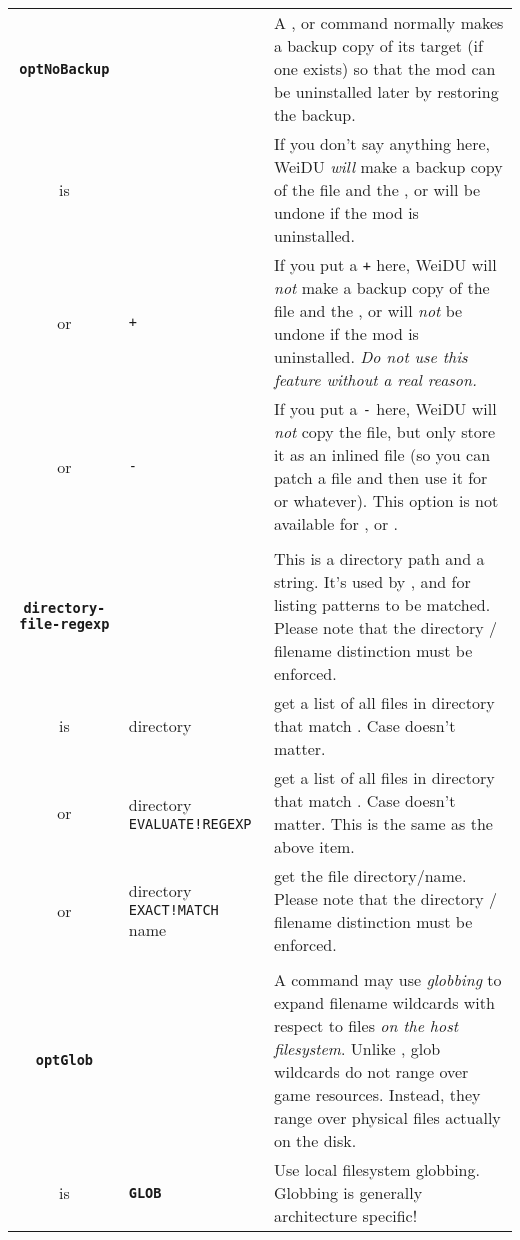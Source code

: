 \documentclass{article}
\def\ttref#1{\ahrefloc{#1}{\tt #1}}
\def\DEFINE#1{{\tt \bf #1}\label{#1}\index{#1}}
\def\t#1{{\tt #1}}
\begin{document}
\begin{tabular}{cp{10in}|p{10in}}
\DEFINE{optNoBackup} & &
  A \ttref{COPY}, \ttref{MOVE} or \ttref{DELETE} command normally makes a backup copy of its target (if one
  exists) so that the mod can be uninstalled later by restoring the backup.
  \\

  is &   & If you don't say anything here, WeiDU {\em will} make a backup
           copy of the file and the \ttref{COPY}, \ttref{MOVE} or \ttref{DELETE} will be undone if the mod
           is uninstalled. \\
  or & \t{+} & If you put a \t{+} here, WeiDU will {\em not} make a backup
           copy of the file and the \ttref{COPY}, \ttref{MOVE} or \ttref{DELETE} will {\em not} be
           undone if the mod is uninstalled. {\em Do not use this feature without
			a real reason.} \\
  or & \t{-} & If you put a \t{-} here, WeiDU will {\em not} copy the file,
           but only store it as an inlined file (so you can patch a file and
           then use it for \ttref{EXTEND!BOTTOM} or whatever).
           This option is not available for \ttref{COPY!LARGE}, \ttref{MOVE} or \ttref{DELETE}. \\
\\

\DEFINE{directory-file-regexp} & & This is a directory path and a \ttref{regexp} string.
It's used by \ttref{MAKE!BIFF}, \ttref{ACTION!BASH!FOR} and \ttref{PATCH!BASH!FOR}
for listing patterns to be matched. Please note that
the directory / filename distinction must be enforced. \\
is & directory \ttref{regexp} & get a list of all files in directory that match \ttref{regexp}.
Case doesn't matter. \\
or & directory \t{EVALUATE!REGEXP} \ttref{regexp} & get a list of all files in directory that match \ttref{regexp}.
Case doesn't matter. This is the same as the above item. \\
or & directory \t{EXACT!MATCH} name & get the file directory/name. Please note that
the directory / filename distinction must be enforced. \\

\\
\DEFINE{optGlob} & &
  A \ttref{COPY} command may use \emph{globbing} to expand filename
  wildcards with respect to files \emph{on the host filesystem}. Unlike
  \ttref{COPY!EXISTING!REGEXP}, glob wildcards do not range over game
  resources. Instead, they range over physical files actually on the disk.
  \\
  is & \DEFINE{GLOB} & Use local filesystem globbing. Globbing is
  generally architecture specific!


\end{tabular}
\end{document}
